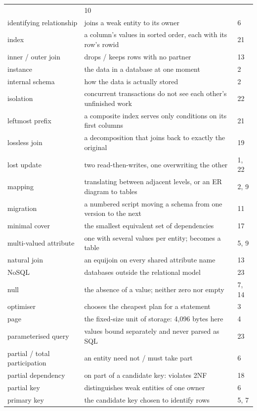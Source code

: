 \begin{longtable}{@{}L{3.9cm}L{8.9cm}R{1.2cm}@{}}
   & 10 \\
identifying relationship & joins a weak entity to its owner & 6 \\
index & a column's values in sorted order, each with its row's rowid & 21 \\
inner / outer join & drops / keeps rows with no partner & 13 \\
instance & the data in a database at one moment & 2 \\
internal schema & how the data is actually stored & 2 \\
isolation & concurrent transactions do not see each other's unfinished work &
  22 \\
leftmost prefix & a composite index serves only conditions on its first
  columns & 21 \\
lossless join & a decomposition that joins back to exactly the original & 19 \\
lost update & two read-then-writes, one overwriting the other & 1, 22 \\
mapping & translating between adjacent levels, or an ER diagram to tables & 2,
  9 \\
migration & a numbered script moving a schema from one version to the next &
  11 \\
minimal cover & the smallest equivalent set of dependencies & 17 \\
multi-valued attribute & one with several values per entity; becomes a table &
  5, 9 \\
natural join & an equijoin on every shared attribute name & 13 \\
NoSQL & databases outside the relational model & 23 \\
null & the absence of a value; neither zero nor empty & 7, 14 \\
optimiser & chooses the cheapest plan for a statement & 3 \\
page & the fixed-size unit of storage: 4{,}096 bytes here & 4 \\
parameterised query & values bound separately and never parsed as SQL & 23 \\
partial / total participation & an entity need not / must take part & 6 \\
partial dependency & on part of a candidate key: violates 2NF & 18 \\
partial key & distinguishes weak entities of one owner & 6 \\
primary key & the candidate key chosen to identify rows & 5, 7 \\

\end{longtable}
